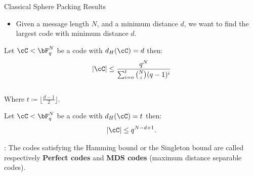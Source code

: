 \begin{frame}{Classical Sphere Packing Results}
\begin{itemize}
    \pause
    \item Given a message length \(N\), \pause and a minimum distance \(d\), \pause we want to find the largest code with minimum distance \(d\). \\
    
\end{itemize}
\quad
\pause
\begin{theorem} \label{hamming}
    Let \(\cC < \bF_q^N \) be a code with \(d_H(\cC) = d\) then:
\[|\cC|\leq \frac{q^N}{\sum_{i=o}^t\binom{N}{i}(q-1)^i}\] \\

Where \(t \coloneqq \lfloor \frac{d-1}{2}\rfloor \).
\end{theorem}
\pause
\begin{theorem} \label{singleton}
Let \(\cC < \bF_q^N \) be a code with \(d_H(\cC) = t\) then: \[ |\cC| \leq q^{N-d+1}.\] 
\end{theorem}
\vspace{0.5cm}:
\pause
The codes satisfying the Hamming bound or the Singleton bound are called respectively \textbf{Perfect codes} and \textbf{MDS codes} (maximum distance separable codes).


              


\end{frame}
